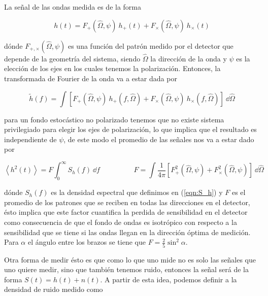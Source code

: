 La señal de las ondas medida es de la forma

\begin{equation}
    h(t) = F_+ \left( \hat{\Omega}, \psi \right) \ h_+ (t) + F_\times \left( \hat{\Omega}, \psi \right) \  h_\times (t)
\end{equation}

\noindent
dónde $F_{+,\times} \left( \hat{\Omega}, \psi \right)$ es una función del patrón medido por el detector que depende de la geometría del sistema, siendo $\hat{\Omega}$ la dirección de la onda y $\psi$ es la elección de los ejes en los cuales tenemos la polarización. Entonces, la transformada de Fourier de la onda va a estar dada por

\begin{equation}
    \tilde{h} (f) = \int \left[ F_+ \left( \hat{\Omega}, \psi \right) \ h_+ \left( f, \hat{\Omega} \right) + F_\times \left( \hat{\Omega}, \psi \right) \  h_\times \left( f, \hat{\Omega} \right) \right] \ \dd \hat{\Omega}
\end{equation}

\noindent
para un fondo estocástico no polarizado tenemos que no existe sistema privilegiado para elegir los ejes de polarización, lo que implica que el resultado es independiente de $\psi$, de este modo el promedio de las señales nos va a estar dado por

\begin{equation}
    \left\langle h^2 (t)\right\rangle = F \int_0^\infty S_h (f) \ \dd f \hspace{2cm} F = \int \frac{1}{4 \pi} \left[ F_+^2 \left( \hat{\Omega}, \psi \right) + F^2_\times \left( \hat{\Omega}, \psi \right) \right] \ \dd \hat{\Omega}
\end{equation}

\noindent
dónde $S_h (f)$ es la densidad espectral que definimos en (\ref{eqn:S_h}) y $F$ es el promedio de los patrones que se reciben en todas las direcciones en el detector, ésto implica que este factor cuantifica la perdida de sensibilidad en el detector como consecuencia de que el fondo de ondas es isotrópico con respecto a la sensibilidad que se tiene si las ondas llegan en la dirección óptima de medición. Para $\alpha$ el ángulo entre los brazos se tiene que $\displaystyle F = \frac{2}{5} \sin^2 \alpha$.

Otra forma de medir ésto es que como lo que uno mide no es solo las señales que uno quiere medir, sino que también tenemos ruido, entonces la señal será de la forma $S(t) = h(t) + n(t)$. A partir de esta idea, podemos definir a la densidad de ruido medido como

